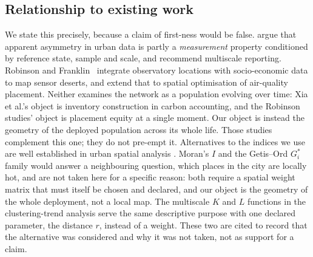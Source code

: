 \documentclass[fleqn,10pt,lineno]{wlpeerj}
\begin{document}
\subsection*{Relationship to existing work}
\label{sec:prior}

We state this precisely, because a claim of first-ness would be false. \citet{xia2026measurement} argue that apparent asymmetry in urban
data is partly a \emph{measurement} property conditioned by reference state, sample and
scale, and recommend multiscale reporting. Robinson and Franklin~\citeyearpar{robinson2021sensor} integrate observatory locations with socio-economic data to
map sensor deserts, and \citet{robinson2022optimizing} extend that to
spatial optimisation of air-quality placement. Neither examines the network as a
population evolving over time: Xia et al.'s object is inventory construction in carbon
accounting, and the Robinson studies' object is placement equity at a single moment. Our
object is
instead the geometry of the deployed population across its whole life. Those studies
complement this one; they do not pre-empt it. Alternatives to the indices we use are
well established in urban spatial analysis \citep{paez2004spatial}. Moran's $I$
\citep{moran1950notes} and the Getis--Ord $G_i^{*}$ family \citep{getis1992analysis} would
answer a neighbouring question, which places in the city are locally hot, and are not taken
here for a specific reason: both require a spatial weight matrix that must itself be
chosen and declared, and our object is the geometry of the whole deployment, not a
local map. The multiscale $K$ and $L$ functions in the clustering-trend analysis serve
the same descriptive purpose with one declared parameter, the distance $r$, instead of a
weight. These two are cited to record that the alternative was considered and why it was
not taken, not as support for a claim.
\end{document}
